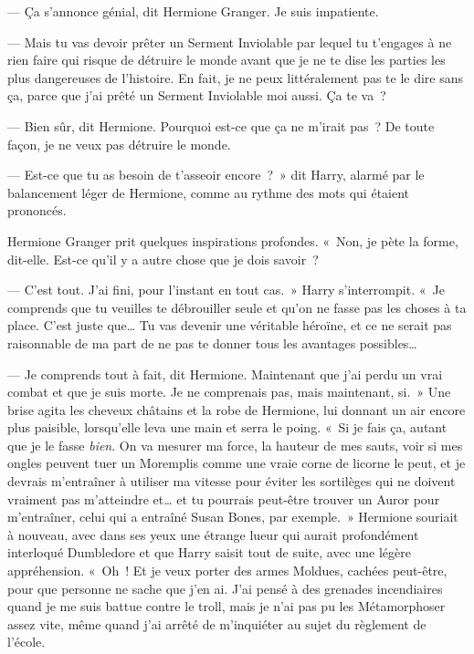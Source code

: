 --- Ça s'annonce génial, dit Hermione Granger.
Je suis impatiente.

--- Mais tu vas devoir prêter un Serment Inviolable par lequel tu t'engages à ne rien faire qui risque de détruire le monde avant que je ne te dise les parties les plus dangereuses de l'histoire.
En fait, je ne peux littéralement pas te le dire sans ça, parce que j'ai prêté un Serment Inviolable moi aussi.
Ça te va~?

--- Bien sûr, dit Hermione.
Pourquoi est-ce que ça ne m'irait pas~?
De toute façon, je ne veux pas détruire le monde.

--- Est-ce que tu as besoin de t'asseoir encore~?~»
dit Harry, alarmé par le balancement léger de Hermione, comme au rythme des mots qui étaient prononcés.

Hermione Granger prit quelques inspirations profondes.
«~Non, je pète la forme, dit-elle.
Est-ce qu'il y a autre chose que je dois savoir~?

--- C'est tout.
J'ai fini, pour l'instant en tout cas.~»
Harry s'interrompit.
«~Je comprends que tu veuilles te débrouiller seule et qu'on ne fasse pas les choses à ta place.
C'est juste que…
Tu vas devenir une véritable héroïne, et ce ne serait pas raisonnable de ma part de ne pas te donner tous les avantages possibles…

--- Je comprends tout à fait, dit Hermione.
Maintenant que j'ai perdu un vrai combat et que je suis morte.
Je ne comprenais pas, mais maintenant, si.~»
Une brise agita les cheveux châtains et la robe de Hermione, lui donnant un air encore plus paisible, lorsqu'elle leva une main et serra le poing.
«~Si je fais ça, autant que je le fasse \emph{bien}.
On va mesurer ma force, la hauteur de mes sauts, voir si mes ongles peuvent tuer un Moremplis comme une vraie corne de licorne le peut, et je devrais m'entraîner à utiliser ma vitesse pour éviter les sortilèges qui ne doivent vraiment pas m'atteindre et… et tu pourrais peut-être trouver un Auror pour m'entraîner, celui qui a entraîné Susan Bones, par exemple.~»
Hermione souriait à nouveau, avec dans ses yeux une étrange lueur qui aurait profondément interloqué Dumbledore et que Harry saisit tout de suite, avec une légère appréhension.
«~Oh~! Et je veux porter des armes Moldues, cachées peut-être, pour que personne ne sache que j'en ai.
J'ai pensé à des grenades incendiaires quand je me suis battue contre le troll, mais je n'ai pas pu les Métamorphoser assez vite, même quand j'ai arrêté de m'inquiéter au sujet du règlement de l'école.

